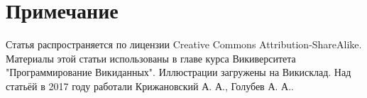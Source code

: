 \section{Примечание}

Статья распространяется по лицензии Creative Commons Attribution-ShareAlike. Материалы этой статьи использованы в главе курса Викиверситета "Программирование Викиданных"\cite{WDBa}. Иллюстрации загружены на Викисклад. Над статьёй в 2017 году работали Крижановский А. А., Голубев А. А..